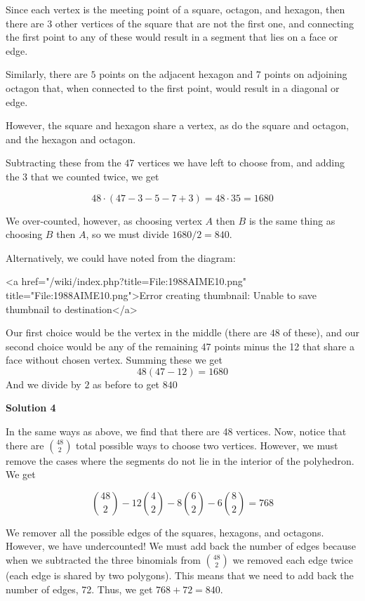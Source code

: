 \begin{enumerate}
 
Since each vertex is the meeting point of a square, octagon, and hexagon, then there are $3$ other vertices of the square that are not the first one, and connecting the first point to any of these would result in a segment that lies on a face or edge. 

 
Similarly, there are $5$ points on the adjacent hexagon and $7$ points on adjoining octagon that, when connected to the first point, would result in a diagonal or edge. 

 
However, the square and hexagon share a vertex, as do the square and octagon, and the hexagon and octagon. 

 
Subtracting these from the $47$ vertices we have left to choose from, and adding the $3$ that we counted twice, we get

 
 \[48 \cdot (47 - 3 - 5 - 7 + 3) = 48 \cdot 35 = 1680\] 

 We over-counted, however, as choosing vertex $A$ then $B$ is the same thing as choosing $B$ then $A$, so we must divide $1680 / 2 = \boxed{840}$.

 


 


 Alternatively, we could have noted from the diagram: 

 


  <a href="/wiki/index.php?title=File:1988AIME10.png" title="File:1988AIME10.png">Error creating thumbnail: Unable to save thumbnail to destination</a> 

 
Our first choice would be the vertex in the middle (there are $48$ of these), and our second choice would be any of the remaining 47 points minus the 12 that share a face without chosen vertex. Summing these we get 
 \[48 (47 - 12) = 1680\] And we divide by $2$ as before to get $\boxed{840}$




\textbf{Solution 4}

In the same ways as above, we find that there are 48 vertices. Now, notice that there are $\binom{48}{2}$ total possible ways to choose two vertices. However, we must remove the cases where the segments do not lie in the interior of the polyhedron. We get

 
 \[\binom{48}{2}-12\binom{4}{2}-8\binom{6}{2}-6\binom{8}{2}=768\]

 We remover all the possible edges of the squares, hexagons, and octagons. However, we have undercounted! We must add back the number of edges because when we subtracted the three binomials from $\binom{48}{2}$ we removed each edge twice (each edge is shared by two polygons). This means that we need to add back the number of edges, 72. Thus, we get $768+72=\boxed{840}$.


\end{enumerate}
